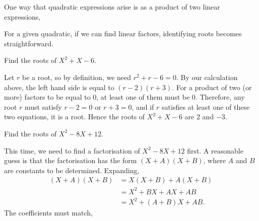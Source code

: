 One way that quadratic expressions arise is as a product of two linear expressions,

For a given quadratic, if we can find linear factors, identifying roots becomes straightforward.

\begin{example}
Find the roots of $X^2 + X - 6$. 
\end{example}
\begin{solution}
Let $r$ be a root, so by definition, we need $r^2 + r - 6 = 0$. By our calculation above, the left hand side is equal to $(r - 2)(r + 3)$. For a product of two (or more) factors to be equal to $0$, at least one of them must be $0$. Therefore, any root $r$ must satisfy $r - 2 = 0$ or $r + 3 = 0$, and if $r$ satisfies at least one of these two equations, it is a root. Hence the roots of $X^2 + X - 6$ are $2$ and $-3$.
\end{solution}

\begin{example}
Find the roots of $X^2 - 8X + 12$.
\end{example}
\begin{solution}
This time, we need to find a factorisation of $X^2 - 8X + 12$ first. A reasonable guess is that the factorisation has the form $(X + A)(X + B)$, where $A$ and $B$ are constants to be determined. Expanding,
\begin{align*}
(X + A)(X + B) &= X(X + B) + A(X + B) \\
&= X^2 + BX + AX + AB \\
&= X^2 + (A + B)X + AB.
\end{align*}
The coefficients must match, 
\end{solution}